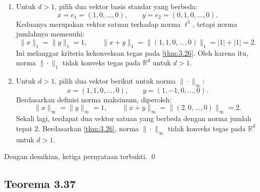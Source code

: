 \documentclass[aspectratio=169,11pt]{beamer}
\theoremstyle{definition}
\newcommand{\myref}[1]{\hyperref[#1]{\nameCref{#1} \ref*{#1}}}
\newcommand{\R}{\mathbb{R}}
\begin{document}
\begin{frame}[allowframebreaks=1]{\insertsection}{\insertsubsection}
\begin{enumerate}[a]
    \item Untuk $d>1$, pilih dua vektor basis standar yang berbeda:
          \begin{equation*}
            x=e_1=(1,0,\dots,0), \qquad y=e_2=(0,1,0,\dots,0).
          \end{equation*}
          Keduanya merupakan vektor satuan terhadap norma $\ell^1$, tetapi norma jumlahnya memenuhi:
          \begin{equation*}
            \|x\|_1=\|y\|_1=1, \qquad
            \|x+y\|_1=\|(1,1,0,\dots,0)\|_1=|1|+|1|=2.
          \end{equation*}
          Ini melanggar kriteria kekonveksan tegas pada \myref{thm:3.26}. Oleh karena itu, norma $\|\cdot\|_1$ tidak konveks tegas pada $\R^d$ untuk $d>1$.

    \item Untuk $d>1$, pilih dua vektor berikut untuk norma $\|\cdot\|_\infty$:
          \begin{equation*}
            x=(1,1,0,\dots,0), \qquad y=(1,-1,0,\dots,0).
          \end{equation*}
          Berdasarkan definisi norma maksimum, diperoleh:
          \begin{equation*}
            \|x\|_\infty=\|y\|_\infty=1, \qquad
            \|x+y\|_\infty=\|(2,0,\dots,0)\|_\infty=2.
          \end{equation*}
          Sekali lagi, terdapat dua vektor satuan yang berbeda dengan norma jumlah tepat $2$. Berdasarkan \myref{thm:3.26}, norma $\|\cdot\|_\infty$ tidak konveks tegas pada $\R^d$ untuk $d>1$.
  \end{enumerate}

  Dengan demikian, ketiga pernyataan terbukti. \qed
\end{frame}

\subsection{Teorema 3.37}
\end{document}
